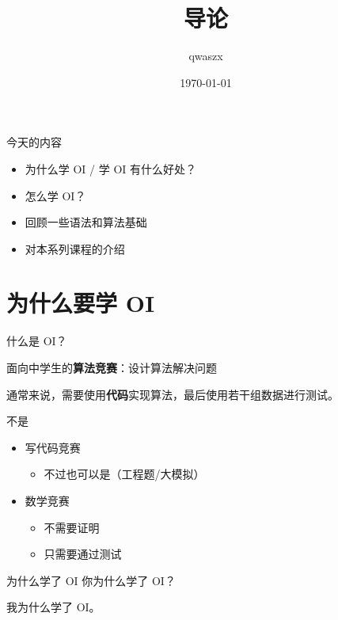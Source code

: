 \documentclass[11pt,aspectratio=169]{beamer}
\title{导论}
\author{qwaszx}
\date{\today}
\begin{document}
\begin{frame}
  \titlepage
\end{frame}

\begin{frame}{今天的内容}
\begin{itemize}
    \item 为什么学 OI / 学 OI 有什么好处？
    \item 怎么学 OI？
    \item 回顾一些语法和算法基础
    \item 对本系列课程的介绍
\end{itemize}
\end{frame}

\section{为什么要学 OI}

\begin{frame}{什么是 OI？}

\pause
面向中学生的\textbf{算法竞赛}：设计算法解决问题

通常来说，需要使用\textbf{代码}实现算法，最后使用若干组数据进行测试。

\pause

\begin{exampleblock}{不是}
    \begin{itemize}
        \item 写代码竞赛
            \begin{itemize}
                \item 不过也可以是（工程题/大模拟）
            \end{itemize}
        \item 数学竞赛
            \begin{itemize}
                \item 不需要证明
                \item 只需要通过测试
            \end{itemize}
    \end{itemize}
\end{exampleblock}
\end{frame}

\begin{frame}{为什么学了 OI}
    你为什么学了 OI？

    \pause
    我为什么学了 OI。
\end{frame}
\end{document}
